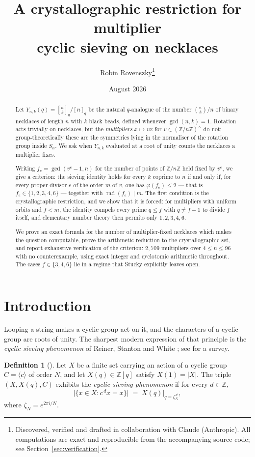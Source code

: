 \documentclass[11pt,a4paper]{article}
\title{A crystallographic restriction for multiplier\\ cyclic sieving on necklaces}
\author{Robin Rovenszky\thanks{Discovered, verified and drafted in collaboration with
Claude (Anthropic). All computations are exact and reproducible from the accompanying
source code; see Section~\ref{sec:verification}.}}
\date{August 2026}
\theoremstyle{plain}
\theoremstyle{definition}
\newtheorem{definition}[theorem]{Definition}
\theoremstyle{remark}
\newcommand{\Z}{\mathbb{Z}}
\newcommand{\Zn}{\Z/n\Z}
\newcommand{\units}[1]{(\Z/#1\Z)^{\times}}
\newcommand{\qint}[1]{[#1]_q}
\newcommand{\qbin}[2]{\genfrac[]{0pt}{}{#1}{#2}_{q}}
\newcommand{\rad}{\operatorname{rad}}
\begin{document}
\maketitle

\begin{abstract}
Let $Y_{n,k}(q)=\qbin{n}{k}\big/\qint{n}$ be the natural $q$-analogue of the number
$\binom{n}{k}/n$ of binary necklaces of length $n$ with $k$ black beads, defined whenever
$\gcd(n,k)=1$. Rotation acts trivially on necklaces, but the \emph{multipliers}
$x\mapsto vx$ for $v\in\units{n}$ do not; group-theoretically these are the symmetries
lying in the normaliser of the rotation group inside $S_n$. We ask when
$Y_{n,k}$ evaluated at a root of unity counts the necklaces a multiplier fixes.

Writing $f_e=\gcd(v^e-1,n)$ for the number of points of $\Zn$ held fixed by $v^e$, we
give a criterion: the sieving identity holds for every $k$ coprime to $n$ if and only if,
for every proper divisor $e$ of the order $m$ of $v$, one has $\varphi(f_e)\le 2$ --- that
is $f_e\in\{1,2,3,4,6\}$ --- together with $\rad(f_e)\mid m$. The first condition is the
crystallographic restriction, and we show that it is forced: for multipliers with uniform
orbits and $f<m$, the identity compels every prime $q\le f$ with $q\ne f-1$ to divide $f$
itself, and elementary number theory then permits only $1,2,3,4,6$.

We prove an exact formula for the number of multiplier-fixed necklaces which makes the
question computable, prove the arithmetic reduction to the crystallographic set, and report
exhaustive verification of the criterion: $2{,}709$ multipliers over $4\le n\le 96$ with no
counterexample, using exact integer and cyclotomic arithmetic throughout. The cases
$f\in\{3,4,6\}$ lie in a regime that Stucky \cite{stucky} explicitly leaves open.
\end{abstract}

\section{Introduction}

Looping a string makes a cyclic group act on it, and the characters of a cyclic group are
roots of unity. The sharpest modern expression of that principle is the \emph{cyclic
sieving phenomenon} of Reiner, Stanton and White \cite{rsw}; see \cite{sagan} for a survey.

\begin{definition}[\cite{rsw}]\label{def:csp}
Let $X$ be a finite set carrying an action of a cyclic group $C=\langle c\rangle$ of order
$N$, and let $X(q)\in\Z[q]$ satisfy $X(1)=|X|$. The triple $(X,X(q),C)$ exhibits the
\emph{cyclic sieving phenomenon} if for every $d\in\Z$,
\[
  \bigl|\{x\in X: c^{\,d}x=x\}\bigr| \;=\; X(q)\big|_{q=\zeta_N^{\,d}},
\]
where $\zeta_N=e^{2\pi i/N}$.
\end{definition}
\end{document}

